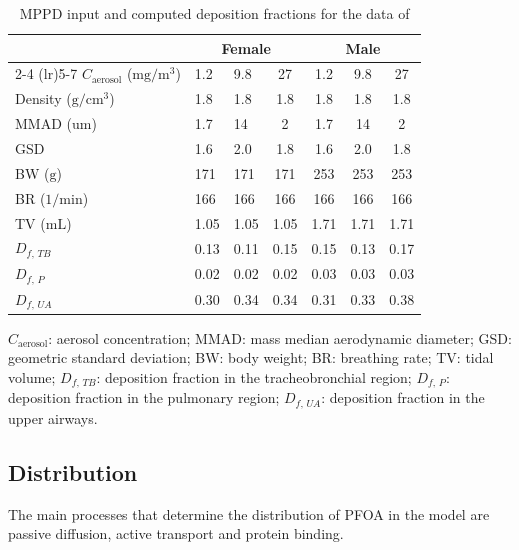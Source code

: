 \documentclass[preprint,12pt,authoryear]{elsarticle}
\begin{document}
\begin{table}[H]
\centering
\caption{MPPD input and computed deposition fractions for the data of \citet{hinderliter_2006} \label{Table:MPPD_Hinderliter}}
\begin{tabular}{lllc|ccc}
\toprule
\multicolumn{1}{c}{} & \multicolumn{3}{c}{Female} & \multicolumn{3}{c}{Male} \\
\cmidrule(lr){2-4} \cmidrule(lr){5-7}
$C_{\text{aerosol}}$ ($\text{mg}/\text{m}^3$)  & 1.2 & 9.8 & 27 & 1.2 & 9.8 & 27\\
Density ($\text{g}/\text{cm}^3$) & 1.8 & 1.8 & 1.8 & 1.8 & 1.8 & 1.8 \\
MMAD ($\text{um}$)  & 1.7 & 14 & 2 & 1.7 & 14 & 2 \\
GSD & 1.6 & 2.0 & 1.8 & 1.6 & 2.0 & 1.8\\
BW ($\text{g}$) & 171 & 171 & 171 & 253 & 253 & 253 \\
BR ($1/\text{min}$) & 166 & 166 & 166 & 166 & 166 & 166 \\
TV ($\text{mL}$)& 1.05 & 1.05 & 1.05 & 1.71 & 1.71 & 1.71 \\
$D_{f, \,TB}$& 0.13 & 0.11 & 0.15 & 0.15 & 0.13 & 0.17 \\
$D_{f, \,P}$  & 0.02 & 0.02 & 0.02 & 0.03 & 0.03 & 0.03 \\
$D_{f, \,UA}$ & 0.30 & 0.34 & 0.34 & 0.31 & 0.33 & 0.38 \\
\bottomrule
\end{tabular}

\vspace{0.5em}
\raggedright
\footnotesize
\vspace{0.5em}
\raggedright
\scriptsize
$C_{\text{aerosol}}$: aerosol concentration; 
MMAD: mass median aerodynamic diameter; 
GSD: geometric standard deviation; 
BW: body weight; 
BR: breathing rate; 
TV: tidal volume; 
$D_{f, \,TB}$: deposition fraction in the tracheobronchial region; 
$D_{f, \,P}$: deposition fraction in the pulmonary region; 
$D_{f, \,UA}$: deposition fraction in the upper airways.
\end{table}

 
 \subsection{Distribution}
 The main processes that determine the distribution of PFOA in the model are passive diffusion, active transport and protein binding. \newline 
\end{document}
